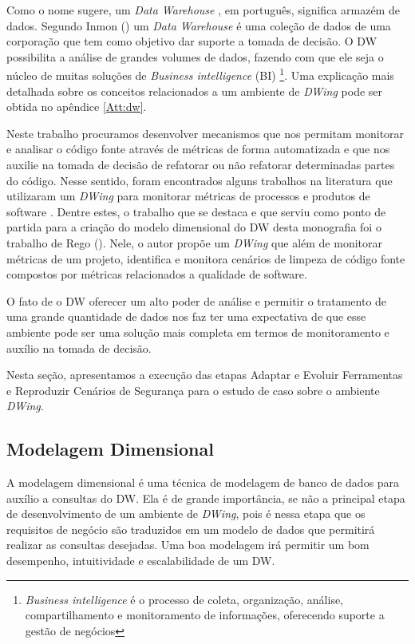 Como o nome sugere, um \emph{Data Warehouse} , em português, significa armazém de dados. Segundo Inmon (\citeyear{inmon2002}) um \emph{Data Warehouse} é uma coleção de dados de uma corporação que tem como objetivo dar suporte a tomada de decisão. 
%
O DW possibilita a análise de grandes volumes de dados, fazendo com que ele seja o núcleo de muitas soluções de \emph{Business intelligence} (BI)
%
\footnote{\emph{Business intelligence} é o processo de coleta, organização, análise, compartilhamento e monitoramento de informações, oferecendo suporte a gestão de negócios}. 
%
Uma explicação mais detalhada sobre os  conceitos relacionados a um ambiente de \emph{DWing} pode ser obtida no  apêndice \ref{Att:dw}.

Neste trabalho procuramos desenvolver mecanismos que nos permitam monitorar e analisar o código fonte através de métricas de forma automatizada e que nos auxilie na tomada de decisão de refatorar ou não refatorar determinadas partes do código. 
%
Nesse sentido, foram encontrados alguns trabalhos na literatura que utilizaram um \emph{DWing} para monitorar métricas de processos e produtos de software \cite{Folleco2007} \cite{Silveira2010}\cite{mazuco2011} \cite{rego2014}. Dentre estes, o trabalho que se destaca e que serviu como ponto de partida para a criação do modelo dimensional do DW desta monografia foi o trabalho de Rego (\citeyear{rego2014}). Nele, o autor propõe um \emph{DWing} que além de monitorar métricas de um projeto,  identifica e monitora cenários de limpeza de código fonte compostos por métricas relacionados a qualidade de software.

% 
O fato de o DW oferecer um alto poder de análise e permitir o tratamento de uma grande quantidade de dados nos faz ter uma expectativa de que esse ambiente pode ser uma solução mais completa em termos de monitoramento e auxílio na tomada de decisão. 

Nesta seção, apresentamos a execução das etapas Adaptar e Evoluir Ferramentas e Reproduzir Cenários de Segurança para o estudo de caso sobre o ambiente \emph{DWing}.

\subsection{Modelagem Dimensional}

A modelagem dimensional é uma técnica de modelagem de banco de dados para auxílio a consultas do DW. Ela é de grande importância, se não a principal etapa de desenvolvimento de um ambiente de \emph{DWing}, pois é nessa etapa que os requisitos de negócio são traduzidos em um modelo de dados que permitirá realizar as consultas desejadas. Uma boa modelagem irá permitir um bom desempenho, intuitividade e escalabilidade de um DW.

